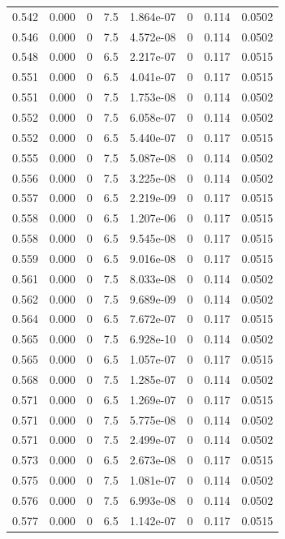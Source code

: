 \documentclass[preview]{standalone}
\begin{document}
{{{{{{{\begin{tabular}{L{1.2cm}C{1.2cm} C{0.3cm}C{0.5cm} C{1.4cm}C{1.4cm} C{1.4cm}C{1.4cm}}
  0.542  &  0.000  & 0     & 7.5 &  1.864e-07  & 0  & 0.114 &  0.0502   \\ 
  0.546  &  0.000  & 0     & 7.5 &  4.572e-08  & 0  & 0.114 &  0.0502   \\ 
  0.548  &  0.000  & 0     & 6.5 &  2.217e-07  & 0  & 0.117 &  0.0515   \\ 
  0.551  &  0.000  & 0     & 6.5 &  4.041e-07  & 0  & 0.117 &  0.0515   \\ 
  0.551  &  0.000  & 0     & 7.5 &  1.753e-08  & 0  & 0.114 &  0.0502   \\ 
  0.552  &  0.000  & 0     & 7.5 &  6.058e-07  & 0  & 0.114 &  0.0502   \\ 
  0.552  &  0.000  & 0     & 6.5 &  5.440e-07  & 0  & 0.117 &  0.0515   \\ 
  0.555  &  0.000  & 0     & 7.5 &  5.087e-08  & 0  & 0.114 &  0.0502   \\ 
  0.556  &  0.000  & 0     & 7.5 &  3.225e-08  & 0  & 0.114 &  0.0502   \\ 
  0.557  &  0.000  & 0     & 6.5 &  2.219e-09  & 0  & 0.117 &  0.0515   \\ 
  0.558  &  0.000  & 0     & 6.5 &  1.207e-06  & 0  & 0.117 &  0.0515   \\ 
  0.558  &  0.000  & 0     & 6.5 &  9.545e-08  & 0  & 0.117 &  0.0515   \\ 
  0.559  &  0.000  & 0     & 6.5 &  9.016e-08  & 0  & 0.117 &  0.0515   \\ 
  0.561  &  0.000  & 0     & 7.5 &  8.033e-08  & 0  & 0.114 &  0.0502   \\ 
  0.562  &  0.000  & 0     & 7.5 &  9.689e-09  & 0  & 0.114 &  0.0502   \\ 
  0.564  &  0.000  & 0     & 6.5 &  7.672e-07  & 0  & 0.117 &  0.0515   \\ 
  0.565  &  0.000  & 0     & 7.5 &  6.928e-10  & 0  & 0.114 &  0.0502   \\ 
  0.565  &  0.000  & 0     & 6.5 &  1.057e-07  & 0  & 0.117 &  0.0515   \\ 
  0.568  &  0.000  & 0     & 7.5 &  1.285e-07  & 0  & 0.114 &  0.0502   \\ 
  0.571  &  0.000  & 0     & 6.5 &  1.269e-07  & 0  & 0.117 &  0.0515   \\ 
  0.571  &  0.000  & 0     & 7.5 &  5.775e-08  & 0  & 0.114 &  0.0502   \\ 
  0.571  &  0.000  & 0     & 7.5 &  2.499e-07  & 0  & 0.114 &  0.0502   \\ 
  0.573  &  0.000  & 0     & 6.5 &  2.673e-08  & 0  & 0.117 &  0.0515   \\ 
  0.575  &  0.000  & 0     & 7.5 &  1.081e-07  & 0  & 0.114 &  0.0502   \\ 
  0.576  &  0.000  & 0     & 7.5 &  6.993e-08  & 0  & 0.114 &  0.0502   \\ 
  0.577  &  0.000  & 0     & 6.5 &  1.142e-07  & 0  & 0.117 &  0.0515   \\ 
\hline 
\end{tabular} 

}}}}}}}
\end{document}
